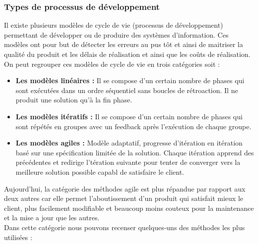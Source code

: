 \subsubsection{Types de processus de développement}
Il existe plusieurs modèles de cycle de vie (processus de développement) permettant de développer ou de produire des systèmes d’information. Ces modèles ont pour but de détecter les erreurs au pus tôt et ainsi de maitriser la qualité du produit et les délais de réalisation et ainsi que les coûts de réalisation. On peut regrouper ces modèles de cycle de vie en trois catégories soit :
\begin{itemize}
    \item \textbf{Les modèles linéaires :}  Il se compose d'un certain nombre de phases qui sont exécutées dans un ordre séquentiel sans boucles de rétroaction. Il ne produit une solution qu'à la fin phase.
    \item \textbf{Les modèles itératifs :} Il se compose d'un certain nombre de phases qui sont répétés en groupes avec un feedback après l'exécution de chaque groupe.
    \item \textbf{Les modèles agiles :} Modèle adaptatif, progresse d'itération en itération basé sur une spécification limitée de la solution. Chaque itération apprend des précédentes et redirige l'tération suivante pour tenter de converger vers la meilleure solution possible capabl de satisfaire le client.
\end{itemize}

Aujourd’hui, la catégorie des méthodes agile est plus répandue par rapport aux deux autres car elle permet l’aboutissement d’un produit qui satisfait mieux le client, plus facilement modifiable et beaucoup moins couteux pour la maintenance et la mise a jour que les autres.\\
Dans cette catégorie nous pouvons recenser quelques-uns des méthodes les plus utilisées :


